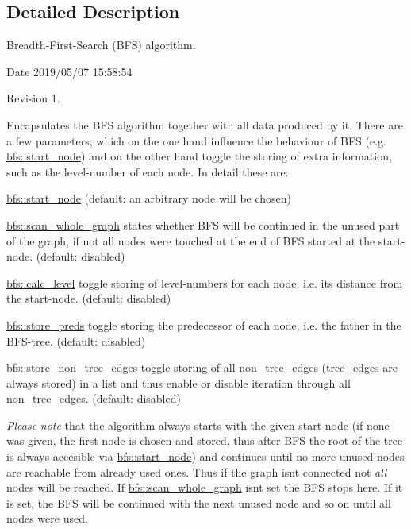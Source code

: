 \subsection{Detailed Description}
Breadth-\/\+First-\/\+Search (B\+FS) algorithm. 

\begin{DoxyParagraph}{Date}
2019/05/07 15\+:58\+:54 
\end{DoxyParagraph}
\begin{DoxyParagraph}{Revision}
1. 
\end{DoxyParagraph}


Encapsulates the B\+FS algorithm together with all data produced by it. There are a few parameters, which on the one hand influence the behaviour of B\+FS (e.\+g. \mbox{\hyperlink{classbfs_a23e2981c2ee617a6e12a8833d2db6210}{bfs\+::start\+\_\+node}}) and on the other hand toggle the storing of extra information, such as the level-\/number of each node. In detail these are\+:
\begin{DoxyItemize}
\item \mbox{\hyperlink{classbfs_a23e2981c2ee617a6e12a8833d2db6210}{bfs\+::start\+\_\+node}} (default\+: an arbitrary node will be chosen)
\item \mbox{\hyperlink{classbfs_a25fc51b1bfbbdd3afefe0a84c1bd2f6b}{bfs\+::scan\+\_\+whole\+\_\+graph}} states whether B\+FS will be continued in the unused part of the graph, if not all nodes were touched at the end of B\+FS started at the start-\/node. (default\+: disabled)
\item \mbox{\hyperlink{classbfs_a491515da4eb8efca0be4fef0df350a8e}{bfs\+::calc\+\_\+level}} toggle storing of level-\/numbers for each node, i.\+e. its distance from the start-\/node. (default\+: disabled)
\item \mbox{\hyperlink{classbfs_a8c7ce0ea2cd8e1932d1da5693d90cf61}{bfs\+::store\+\_\+preds}} toggle storing the predecessor of each node, i.\+e. the father in the B\+F\+S-\/tree. (default\+: disabled)
\item \mbox{\hyperlink{classbfs_a7de47b820fb9532f497660f767c9457f}{bfs\+::store\+\_\+non\+\_\+tree\+\_\+edges}} toggle storing of all non\+\_\+tree\+\_\+edges (tree\+\_\+edges are always stored) in a list and thus enable or disable iteration through all non\+\_\+tree\+\_\+edges. (default\+: disabled)
\end{DoxyItemize}

{\itshape Please} {\itshape note} that the algorithm always starts with the given start-\/node (if none was given, the first node is chosen and stored, thus after B\+FS the root of the tree is always accesible via \mbox{\hyperlink{classbfs_a23e2981c2ee617a6e12a8833d2db6210}{bfs\+::start\+\_\+node}}) and continues until no more unused nodes are reachable from already used ones. Thus if the graph isn\textquotesingle{}t connected not {\itshape all} nodes will be reached. If \mbox{\hyperlink{classbfs_a25fc51b1bfbbdd3afefe0a84c1bd2f6b}{bfs\+::scan\+\_\+whole\+\_\+graph}} isn\textquotesingle{}t set the B\+FS stops here. If it is set, the B\+FS will be continued with the next unused node and so on until all nodes were used.

